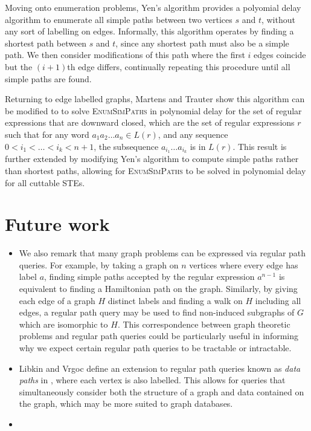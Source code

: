 \documentclass{article}
\begin{document}
Moving onto enumeration problems, Yen's algorithm \cite{yenFindingShortestLoopless1971} provides a polyomial delay algorithm to enumerate all simple paths between two vertices $s$ and $t$, without any sort of labelling on edges. Informally, this algorithm operates by finding a shortest path between $s$ and $t$, since any shortest path must also be a simple path. We then consider modifications of this path where the first $i$ edges coincide but the $(i+1)$th edge differs, continually repeating this procedure until all simple paths are found.

Returning to edge labelled graphs, Martens and Trauter show this algorithm can be modified to to solve \textsc{EnumSimPaths} in polynomial delay for the set of regular expressions that are downward closed, which are the set of regular expressions $r$ such that for any word $a_1 a_2 \dots a_n \in L(r)$, and any sequence $0 < i_1 < \dots < i_k < n + 1$, the subsequence $a_{i_1} \dots a_{i_k}$ is in $L(r)$. This result is further extended by modifying Yen's algorithm to compute simple paths rather than shortest paths, allowing for \textsc{EnumSimPaths} to be solved in polynomial delay for all cuttable STEs.

\section{Future work}
\label{sec:future_work}

\begin{itemize}
    \item We also remark that many graph problems can be expressed via regular path queries. For example, by taking a graph on $n$ vertices where every edge has label $a$, finding simple paths accepted by the regular expression $a^{n-1}$ is equivalent to finding a Hamiltonian path on the graph. Similarly, by giving each edge of a graph $H$ distinct labels and finding a walk on $H$ including all edges, a regular path query may be used to find non-induced subgraphs of $G$ which are isomorphic to $H$. This correspondence between graph theoretic problems and regular path queries could be particularly useful in informing why we expect certain regular path queries to be tractable or intractable.
    \item Libkin and Vrgoc define an extension to regular path queries known as \emph{data paths} in \cite{libkinRegularPathQueries2012}, where each vertex is also labelled. This allows for queries that simultaneously consider both the structure of a graph and data contained on the graph, which may be more suited to graph databases.
    \item 

\end{itemize}



\end{document}
